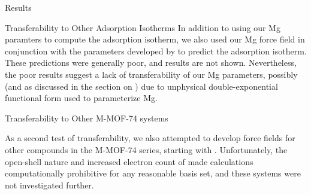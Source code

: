 \begin{section}{Results}
\begin{subsection}{Transferability to Other Adsorption Isotherms}
In addition to using our Mg paramters to compute the \co adsorption isotherm,
we also used our Mg force field in conjunction with the  parameters
developed by \citeauthor{Yu2011}\cite{Yu2011} to predict the 
adsorption isotherm. These predictions were generally poor, and results are
not shown. Nevertheless, the poor  results suggest a lack of
transferability of our Mg parameters, possibly (and as discussed in the
section on ) due to unphysical double-exponential
functional form used to parameterize Mg.

\end{subsection}
\begin{subsection}{Transferability to Other M-MOF-74 systems}

As a second test of transferability, we also attempted to develop force fields
for other compounds in the M-MOF-74 series, starting with \comof.
Unfortunately, the open-shell nature and increased electron count of \comof
made \lmoeda calculations computationally prohibitive for any reasonable basis
set, and these systems were not investigated further.

\end{subsection}


\end{section}
